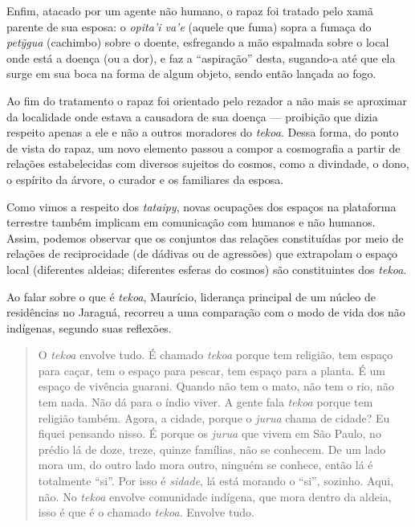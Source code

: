 Enfim, atacado por um agente não humano, o rapaz foi tratado pelo xamã
parente de sua esposa: o \emph{opita'i va'e} (aquele que fuma) sopra a
fumaça do \emph{petỹgua} (cachimbo) sobre o doente, esfregando a mão
espalmada sobre o local onde está a doença (ou a dor), e faz a
``aspiração'' desta, sugando-a até que ela surge em sua boca na forma de
algum objeto, sendo então lançada ao fogo.

Ao fim do tratamento o rapaz foi orientado pelo rezador a não mais se
aproximar da localidade onde estava a causadora de sua doença ---
proibição que dizia respeito apenas a ele e não a outros moradores do
\emph{tekoa}. Dessa forma, do ponto de vista do rapaz, um novo elemento
passou a compor a cosmografia a partir de relações estabelecidas com
diversos sujeitos do cosmos, como a divindade, o dono, o espírito da
árvore, o curador e os familiares da esposa.

Como vimos a respeito dos \emph{tataipy}, novas ocupações dos espaços na
plataforma terrestre também implicam em comunicação com humanos e não
humanos. Assim, podemos observar que os conjuntos das relações
constituídas por meio de relações de reciprocidade (de dádivas ou de
agressões) que extrapolam o espaço local (diferentes aldeias; diferentes
esferas do cosmos) são constituintes dos \emph{tekoa}.

Ao falar sobre o que é \emph{tekoa}, Maurício, liderança principal de um
núcleo de residências no Jaraguá, recorreu a uma comparação com o modo
de vida dos não indígenas, segundo suas reflexões.

\begin{quote}
O \emph{tekoa} envolve tudo. É chamado \emph{tekoa} porque tem religião,
tem espaço para caçar, tem o espaço para pescar, tem espaço para a
planta. É um espaço de vivência guarani. Quando não tem o mato, não tem
o rio, não tem nada. Não dá para o índio viver. A gente fala
\emph{tekoa} porque tem religião também. Agora, a cidade, porque o
\emph{jurua} chama de cidade? Eu fiquei pensando nisso. É porque os
\emph{jurua} que vivem em São Paulo, no prédio lá de doze, treze, quinze
famílias, não se conhecem. De um lado mora um, do outro lado mora outro,
ninguém se conhece, então lá é totalmente ``si''. Por isso é
\emph{sidade}, lá está morando o ``si'', sozinho. Aqui, não. No
\emph{tekoa} envolve comunidade indígena, que mora dentro da aldeia,
isso é que é o chamado \emph{tekoa}. Envolve tudo.
\end{quote}

